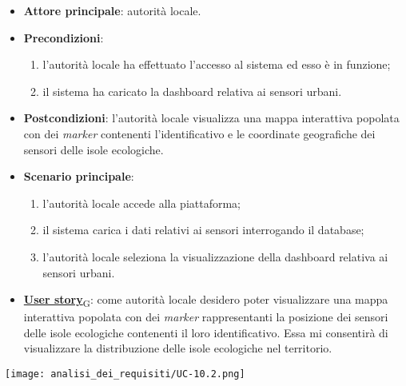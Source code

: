 \begin{itemize}
	\item \textbf{Attore principale}: autorità locale.
	\item \textbf{Precondizioni}:
	      \begin{enumerate}
		      \item l'autorità locale ha effettuato l'accesso al sistema ed esso è in funzione;
		      \item il sistema ha caricato la dashboard relativa ai sensori urbani.
	      \end{enumerate}
	\item \textbf{Postcondizioni}: l'autorità locale visualizza una mappa interattiva popolata con dei \textit{marker} contenenti l'identificativo e le coordinate geografiche dei sensori delle isole ecologiche.
	\item \textbf{Scenario principale}:
	      \begin{enumerate}
		      \item l'autorità locale accede alla piattaforma;
		      \item il sistema carica i dati relativi ai sensori interrogando il database;
		      \item l'autorità locale seleziona la visualizzazione della dashboard relativa ai sensori urbani.
	      \end{enumerate}
	\item \href{https://7last.github.io/docs/pb/documentazione-interna/glossario\#user-story}{\textbf{User story}\textsubscript{G}}:
	      come autorità locale desidero poter visualizzare una mappa interattiva popolata con dei \textit{marker} rappresentanti la posizione dei sensori delle isole ecologiche
	      contenenti il loro identificativo. Essa mi consentirà di visualizzare la distribuzione delle isole ecologiche nel territorio.
\end{itemize}
\begin{center}
	\texttt{[image: analisi\_dei\_requisiti/UC-10.2.png]}
\end{center}


